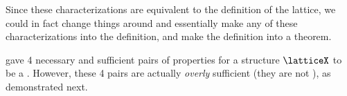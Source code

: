 Since these characterizations are equivalent to the definition of the lattice,
we could in fact change things around
and essentially make any of these characterizations into the definition,
and make the definition into a theorem.%

 gave 4 necessary and sufficient pairs of properties for a structure 
$\latticeX$ to be a . 
However, these 4 pairs are actually \emph{overly} sufficient
(they are not ), as demonstrated next.
\begin{theorem}
\label{thm:lat_char_6e3v}
\end{theorem}
